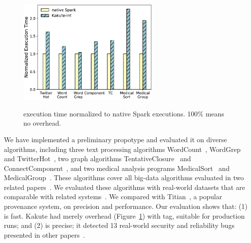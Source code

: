 \begin{figure}
  \vspace{-.1in}
  \includegraphics[width=7cm]{figures/time_overhead.ps}\\
  \vspace{-.3in}
  \caption{\kakute execution time normalized to native Spark executions. 100\% 
means no overhead.}
  \label{fig:scalability}
\end{figure}

 We have implemented a \kakute preliminary propotype 
and evaluated it on \appeval diverse algorithms, including three text 
processing algorithms WordCount~\cite{spark:example}, 
WordGrep~\cite{newt:socc13} and TwitterHot~\cite{spark:example}, two graph 
algorithms TentativeClosure~\cite{spark:example}
and ConnectComponent~\cite{spark:example}, and two medical analysis programs 
MedicalSort~\cite{pigmix} and MedicalGroup~\cite{pigmix}.
These algorithms cover all big-data algorithms evaluated in two related 
papers~\cite{vldb15:titian,icse16:bigdebug}. We evaluated these algorithms with 
real-world datasets that are comparable with related 
systems~\cite{vldb16:output, icse16:bigdebug, vldb15:titian}.
We compared \kakute with Titian~\cite{vldb15:titian}, a popular provenance 
system, on precision and performance. Our evaluation shows that: (1) \kakute is 
fast. Kakute had merely \timeavg overhead (Figure~\ref{fig:scalability}) with 
 tag, suitable for production runs; and (2) \kakute is precise; it 
detected 13 real-world security and reliability bugs presented in 
other papers~\cite{arthur:dave2013,icse16:bigdebug,airavat:nsdi10}.













